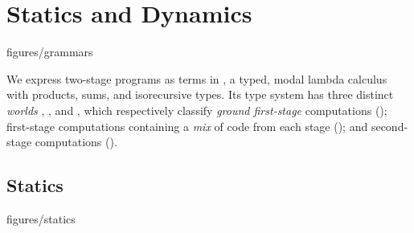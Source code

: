 
\section{\texorpdfstring{\lang}{λ12} Statics and Dynamics}
\label{sec:semantics}



 {figures/grammars}

We express two-stage programs as terms in \lang, a typed, modal lambda calculus
with products, sums, and isorecursive types. Its type system has three distinct
\emph{worlds} \bbonep, \bbonem, and \bbtwo, which respectively classify
\emph{ground first-stage} computations (\bbonep); 
first-stage computations containing a \emph{mix} of code from each stage
(\bbonem); 
and second-stage computations (\bbtwo).

\subsection{Statics}

 {figures/statics}

